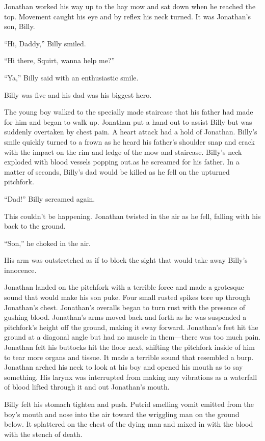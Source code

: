 Jonathan worked his way up to the hay mow and sat down when he reached
the top. Movement caught his eye and by reflex his neck turned. It was
Jonathan's son, Billy.

``Hi, Daddy,'' Billy smiled.

``Hi there, Squirt, wanna help me?''

``Ya,'' Billy said with an enthusiastic smile.

Billy was five and his dad was his biggest hero.

The young boy walked to the specially made staircase that his father had
made for him and began to walk up. Jonathan put a hand out to assist
Billy but was suddenly overtaken by chest pain. A heart attack had a
hold of Jonathan. Billy's smile quickly turned to a frown as he heard
his father's shoulder snap and crack with the impact on the rim and
ledge of the mow and staircase. Billy's neck exploded with blood vessels
popping out.as he screamed for his father. In a matter of seconds,
Billy's dad would be killed as he fell on the upturned pitchfork.

``Dad!'' Billy screamed again.

This couldn't be happening. Jonathan twisted in the air as he fell,
falling with his back to the ground.

``Son,'' he choked in the air.

His arm was outstretched as if to block the sight that would take away
Billy's innocence.

Jonathan landed on the pitchfork with a terrible force and made a
grotesque sound that would make his son puke. Four small rusted spikes
tore up through Jonathan's chest. Jonathan's overalls began to turn rust
with the presence of gushing blood. Jonathan's arms moved back and forth
as he was suspended a pitchfork's height off the ground, making it sway
forward. Jonathan's feet hit the ground at a diagonal angle but had no
muscle in them---there was too much pain. Jonathan felt his buttocks hit
the floor next, shifting the pitchfork inside of him to tear more organs
and tissue. It made a terrible sound that resembled a burp. Jonathan
arched his neck to look at his boy and opened his mouth as to say
something. His larynx was interrupted from making any vibrations as a
waterfall of blood lifted through it and out Jonathan's mouth.

Billy felt his stomach tighten and push. Putrid smelling vomit emitted
from the boy's mouth and nose into the air toward the wriggling man on
the ground below. It splattered on the chest of the dying man and mixed
in with the blood with the stench of death.

